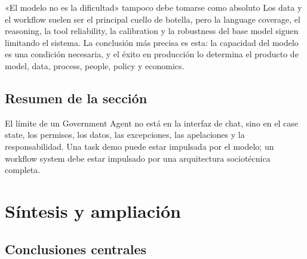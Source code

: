 \documentclass[a4paper]{article}
\begin{document}
\begin{warningbox}{«El modelo no es la dificultad» tampoco debe tomarse como absoluto}
Los data y el workflow suelen ser el principal cuello de botella, pero la language coverage, el reasoning, la tool reliability, la calibration y la robustness del base model siguen limitando el sistema. La conclusión más precisa es esta: la capacidad del modelo es una condición necesaria, y el éxito en producción lo determina el producto de model, data, process, people, policy y economics.
\end{warningbox}


\subsection{Resumen de la sección}

El límite de un Government Agent no está en la interfaz de chat, sino en el case state, los permisos, los datos, las excepciones, las apelaciones y la responsabilidad. Una task demo puede estar impulsada por el modelo; un workflow system debe estar impulsado por una arquitectura sociotécnica completa.
\section{Síntesis y ampliación}

\subsection{Conclusiones centrales}
\end{document}
